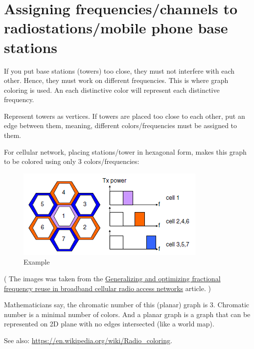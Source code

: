 \section{Assigning frequencies/channels to radiostations/mobile phone base stations}

If you put base stations (towers) too close, they must not interfere with each other.
Hence, they must work on different frequencies.
This is where graph coloring is used.
An each distinctive color will represent each distinctive frequency.

Represent towers as vertices.
If towers are placed too close to each other, put an edge between them, meaning, different colors/frequencies must be assigned to them.

For cellular network, placing stations/tower in hexagonal form, makes this graph to be colored using only 3 colors/frequencies:

\begin{figure}[H]
\centering
\includegraphics[scale=0.85]{color/freq.png}
\caption{Example}
\end{figure}

( The images was taken from the 
\href{https://jwcn-eurasipjournals.springeropen.com/articles/10.1186/1687-1499-2012-230}{Generalizing and optimizing fractional frequency reuse in broadband cellular radio access networks} article. )

Mathematicians say, the chromatic number of this (planar) graph is 3.
Chromatic number is a minimal number of colors.
And a planar graph is a graph that can be represented on 2D plane with no edges intersected (like a world map).

See also: \url{https://en.wikipedia.org/wiki/Radio_coloring}.

